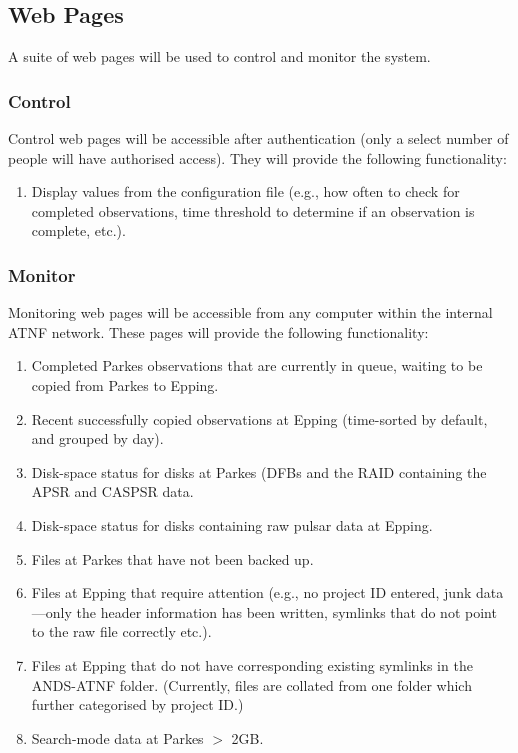 \documentclass{article}
\begin{document}
\subsection{Web Pages}
A suite of web pages will be used to control and monitor the system.

\subsubsection{Control}
Control web pages will be accessible after authentication (only a select number of people will have authorised access). They will provide the following functionality:

\begin{enumerate}
\item Display values from the configuration file (e.g., how often to check for completed observations, time threshold to determine if an observation is complete, etc.).
\end{enumerate}

\subsubsection{Monitor}
Monitoring web pages will be accessible from any computer within the internal ATNF network. These pages will provide the following functionality:

\begin{enumerate}
\item Completed Parkes observations that are currently in queue, waiting to be copied from Parkes to Epping.
\item Recent successfully copied observations at Epping (time-sorted by default, and grouped by day).
\item Disk-space status for disks at Parkes (DFBs and the RAID containing the APSR and CASPSR data.
\item Disk-space status for disks containing raw pulsar data at Epping.
\item Files at Parkes that have not been backed up.
\item Files at Epping that require attention (e.g., no project ID entered, junk data---only the header information has been written, symlinks that do not point to the raw file correctly etc.).
\item Files at Epping that do not have corresponding existing symlinks in the ANDS-ATNF folder. (Currently, files are collated from one folder which further categorised by project ID.)
\item Search-mode data at Parkes $>$ 2GB.
\end{enumerate}
\end{document}
